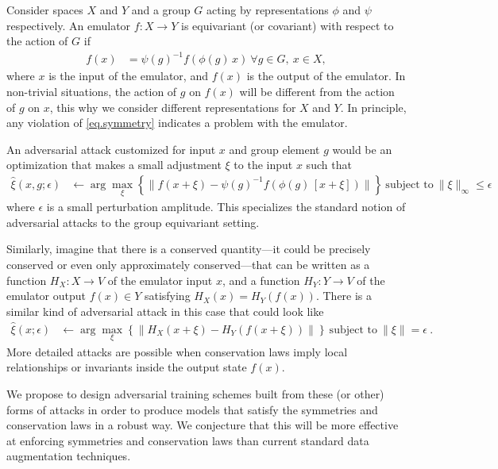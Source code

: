 \documentclass[10pt]{article}
\begin{document}
\begin{appendices}
Consider spaces $X$ and $Y$ and a group $G$ acting by representations $\phi$ and $\psi$ respectively. An emulator $f: X \to Y$  is equivariant (or covariant) with respect to the action of $G$ if
\begin{align}
    f(x) &= \psi(g)^{-1} f( \phi(g)\,x) ~ \forall g\in G, ~ x \in X, \label{eq.symmetry}
\end{align}
where $x$ is the input of the emulator, and $f(x)$ is the output of the emulator.
In non-trivial situations, the action of $g$ on $f(x)$ will be different from the action of $g$ on $x$, this why we consider different representations for $X$ and $Y$.
In principle, any violation of \eqref{eq.symmetry} indicates a problem with the emulator.

An adversarial attack customized for input $x$ and group element $g$ would be an optimization that makes a small adjustment $\xi$ to the input $x$ such that
\begin{align}
    \hat{\xi}(x,g;\epsilon) &\leftarrow \arg\max_{\xi} \left\{\|f(x+\xi) - \psi(g)^{-1} f(\phi(g)\,[x+\xi])\|\right\} ~\text{subject to}~\|\xi\|_\infty\leq\epsilon
\end{align}
where $\epsilon$ is a small perturbation amplitude. This specializes the standard notion of adversarial attacks to the group equivariant setting.  

Similarly, imagine that there is a conserved quantity---it could be precisely conserved or even only approximately conserved---that can be written as a function $H_X: X \to V$ of the emulator input $x$, and a function $H_Y: Y \to V$ of the emulator output $f(x)\in Y$ satisfying $H_X(x)= H_Y(f(x))$.
There is a similar kind of adversarial attack in this case that could look like
\begin{align}
    \hat{\xi}(x;\epsilon) &\leftarrow \arg\max_\xi \left\{\|H_X(x + \xi) - H_Y(f(x+\xi))\|\right\} ~\text{subject to}~\|\xi\| = \epsilon ~.
\end{align}
More detailed attacks are possible when conservation laws imply local relationships or invariants inside the output state $f(x)$.

We propose to design adversarial training schemes built from these (or other) forms of attacks in order to produce models that satisfy the symmetries and conservation laws in a robust way.
We conjecture that this will be more effective at enforcing symmetries and conservation laws than current standard data augmentation techniques. 
\end{appendices}\clearpage

\footnotesize %


\end{document}

